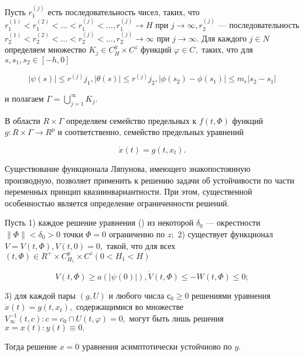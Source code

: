	Пусть ${r^{(j)}_1}$ есть последовательность чисел, таких, что $r^{(1)}_1 < r^{(2)}_1 < ... < r^{(j)}_1 < ..., r^{(j)}_1 \to H $ при $j \to \infty, {r^{(j)}_2}$ --- последовательность $r^{(1)}_2 < r^{(2)}_2 < ... < r^{(j)}_2 < ..., r^{(j)}_2 \to \infty $ при $j \to \infty.$ Для каждого $j \in N$ определяем множество $K_j \in C^y_H \times C^z$ функций $\varphi \in C,$ таких, что для $s, s_1, s_2 \in [-h, 0]$
		
		\begin{equation}
		| \psi(s) | \le r^{(j)}j_1, | \theta (s) | \le r^{(j)}j_2, | \phi(s_2) - \phi(s_1) | \le m_r | s_2 - s_1 | 
		\end{equation}
		
		и полагаем $ \Gamma = \bigcup\limits_{j=1}^{\infty } {K_j}.$
		
		В области $R \times \Gamma$ определяем семейство предельных к $f(t, \varPhi)$ функций $g : R \times \Gamma \to R^p$ и соответственно, семейство предельных уравнений
		
		\begin{equation}
		\dot x(t) = g(t, x_t).
		\end{equation}
		
		Существование функционала Ляпунова, имеющего знакопостоянную производную, позволяет применить к решению задачи об устойчивости по части переменных принцип квазиинвариантности. При этом, существенной особенностью является определение ограниченности решений.
		
		\begin{theorem}\label{t-1.11} Пусть 
			1) каждое решение уравнения () из некоторой $\delta_0$ --- окрестности $ \| \varPhi \| < \delta_0 > 0$ точки $\varPhi = 0$ ограниченно по $z;$
			2) существует функционал $V = V(t, \varPhi), V(t, 0) = 0,$ такой, что для всех $ (t, \varPhi) \in R^+ \times C^y_{H_1} \times C^z (0 < H_1 < H)$
			
			\begin{equation}
			V(t, \varPhi) \ge a(| \psi(0) |), \dot V (t, \varPhi) \le - W(t, \varPhi) \le 0;
			\end{equation}
			
			3) для каждой пары $ (g, U) $ и любого числа $с_0 \ge 0$ решениями уравнения $\dot x(t) = g(t, x_t), $ содержащимися во множестве ${V_{\infty}^{-1}(t, c) : c = c_0} \cap {U(t, \varphi) = 0}, $ могут быть лишь решения $x = x(t) : y(t) \equiv 0.$
			
			Тогда решение $x = 0$ уравнения асимптотически устойчиово по $y.$
			
		\end{theorem}
		
